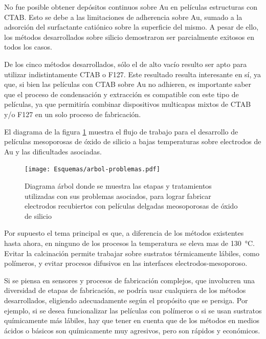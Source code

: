 	No fue posible obtener depósitos continuos sobre Au en películas estructuras con CTAB. Esto se debe a las limitaciones de adherencia sobre Au, sumado a la adsorción del surfactante catiónico sobre la superficie del mismo. A pesar de ello, los métodos desarrollados sobre silicio demostraron ser parcialmente exitosos en todos los casos.

	De los cinco métodos desarrollados, sólo el de alto vacío resulto ser apto para utilizar indistintamente CTAB o F127. Este resultado resulta interesante en sí, ya que, si bien las películas con CTAB sobre Au no adhieren, es importante saber que el proceso de condensación y extracción es compatible con este tipo de películas, ya que permitiría combinar dispositivos multicapas mixtos de CTAB y/o F127 en un solo proceso de fabricación.

	El diagrama de la figura \ref{fig:flujo-trabajo} muestra el flujo de trabajo para el desarrollo de películas mesoporosas de óxido de silicio a bajas temperaturas sobre electrodos de Au y las dificultades asociadas.

		\begin{figure}[!ht]
			\begin{center}
			\texttt{[image: Esquemas/arbol-problemas.pdf]}
			\caption[Flujo de trabajo para obtener electrodos con películas mesoporosa]{Diagrama árbol donde se muestra las etapas y tratamientos utilizadas con sus problemas asociados, para lograr fabricar electrodos recubiertos con películas delgadas meosoporosas de óxido de silicio}
			\label{fig:flujo-trabajo}
			\end{center}
			\end{figure}	
	
	Por supuesto el tema principal es que, a diferencia de los métodos existentes hasta ahora, en ninguno de los procesos la temperatura se eleva mas de \SI{130}{\celsius}. Evitar la calcinación permite trabajar sobre sustratos térmicamente lábiles, como polímeros, y evitar procesos difusivos en las interfaces electrodos-mesoporoso. 

	Si se piensa en sensores y procesos de fabricación complejos, que involucren una diversidad de etapas de fabricación, se podría usar cualquiera de los métodos desarrollados, eligiendo adecuadamente según el propósito que se persiga. Por ejemplo, si se desea funcionalizar las películas con polímeros o si se usan sustratos químicamente más lábiles, hay que tener en cuenta que de los métodos en medios ácidos o básicos son químicamente muy agresivos, pero son rápidos y económicos. 

